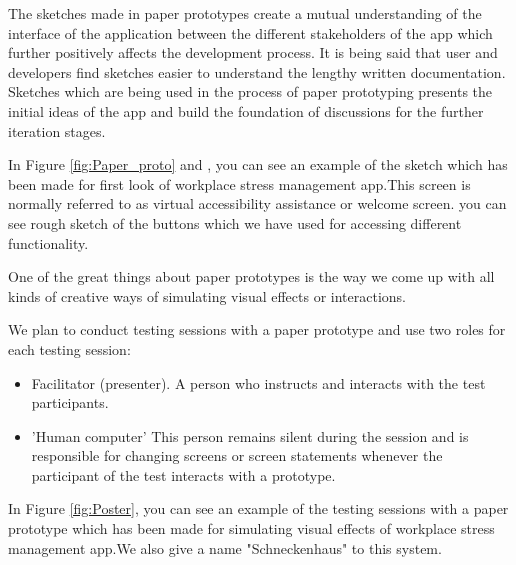 The sketches made in paper prototypes create a mutual understanding of the interface of the application between the different stakeholders of the app which further positively affects the development process. It is being said that user and developers find sketches easier to understand the lengthy written documentation. Sketches which are being used in the process of paper prototyping presents the initial ideas of the app and build the foundation of discussions for the further iteration stages\citep{Bansemir2014ExperienceVisualizations}.

In Figure \ref{fig:Paper_proto} and , you can see an example of the sketch which has been made for first look of workplace stress management app.This screen is normally referred to as virtual accessibility assistance or welcome screen. you can see rough sketch of the buttons which we have used for accessing different functionality. 

One of the great things about paper prototypes is the way we come up with all kinds of creative ways of simulating visual effects or interactions.

We plan to conduct testing sessions with a paper prototype and use two roles for each testing session:
\begin{itemize}
    \item Facilitator (presenter). A person who instructs and interacts with the test participants.
    \item 'Human computer' This person remains silent during the session and is responsible for changing screens or screen statements whenever the participant of the test interacts with a prototype.
\end{itemize}

In Figure \ref{fig:Poster}, you can see an example of the testing sessions with a paper prototype which has been made for simulating visual effects of workplace stress management app.We also give a name "Schneckenhaus" to this system.

